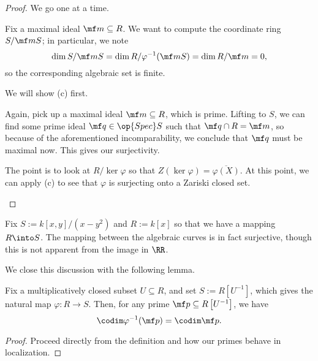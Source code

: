 \begin{proof}
	We go one at a time.
	\begin{listalph}
		\item Fix a maximal ideal $\mf m\subseteq R$. We want to compute the coordinate ring $S/\mf mS$; in particular, we note
		\[\dim S/\mf mS=\dim R/\varphi^{-1}(\mf mS)=\dim R/\mf m=0,\]
		so the corresponding algebraic set is finite.
		\item We will show (c) first.
		\item Again, pick up a maximal ideal $\mf m\subseteq R$, which is prime. Lifting to $S$, we can find some prime ideal $\mf q\in\op{Spec}S$ such that $\mf q\cap R=\mf m$, so because of the aforementioned incomparability, we conclude that $\mf q$ must be maximal now. This gives our surjectivity. %
		\setcounter{enumii}{1}
		\item The point is to look at $R/\ker\varphi$ so that $Z(\ker\varphi)=\overline{\varphi(X)}$. At this point, we can apply (c) to see that $\varphi$ is surjecting onto a Zariski closed set.
		\qedhere
	\end{listalph}
\end{proof}
\begin{example}
	Fix $S:=k[x,y]/\left(x-y^2\right)$ and $R:=k[x]$ so that we have a mapping $R\into S$. The mapping between the algebraic curves is in fact surjective, though this is not apparent from the image in $\RR$.
\end{example}
We close this discussion with the following lemma.
\begin{lem}
	Fix a multiplicatively closed subset $U\subseteq R$, and set $S:=R\left[U^{-1}\right]$, which gives the natural map $\varphi:R\to S$. Then, for any prime $\mf p\subseteq R\left[U^{-1}\right]$, we have
	\[\codim\varphi^{-1}(\mf p)=\codim\mf p.\]
\end{lem}
\begin{proof}
	Proceed directly from the definition and how our primes behave in localization.
\end{proof}

